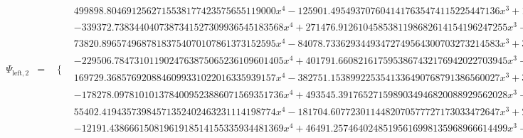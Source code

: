 \documentclass{article}
\begin{document}
\begin{landscape}
\begin{eqnarray*}
\begin{array}{cc}
\end{array}\\
\Psi_{\text{left},2} & = & \begin{array}{cc}
 \{ & 
\begin{array}{cc}
 499898.8046912562715538177423575655119000 x^4-125901.4954937076041417635474115225447136 x^3+10063.51812541990523759074067280460633435 x^2-258.0041589488695995300186908780941589620 x & x\geq 0\land x<\frac{1}{8} \\
 -339372.7383440407387341527309936545183568 x^4+271476.9126104585381198682614154196247255 x^3-79564.22931529188440949102107873763136768 x^2+10078.62875130954778660120003130095756047 x-462.8749842882781474831628981741427228208 & x\geq \frac{1}{8}\land x<\frac{1}{4} \\
 73820.89657496878183754070107861373152595 x^4-84078.73362934493472749564300703273214583 x^3+35604.97321383667501281753900254004432791 x^2-6663.891025729675801403187434644828991624 x+466.1991379955411091305325008009694092379 & x\geq \frac{1}{4}\land x<\frac{3}{8} \\
 -229506.7847310119024763875065236109601405 x^4+401791.6608216175953867432176942022703945 x^3-263037.3081998261763755971914937287747567 x^2+76324.43015099794594543257237031753952351 x-8281.498676654677562417380436273717790529 & x\geq \frac{3}{8}\land x<\frac{1}{2} \\
 169729.3685769208846099331022016335939157 x^4-382751.1538992253541336490768791386560027 x^3+323205.3427727217608361923821132108881951 x^2-121129.1864348841726692230846692387056585 x+17000.23913150896693911705345810932023365 & x\geq \frac{1}{2}\land x<\frac{5}{8} \\
 -178278.0978101013784009523886071569351736 x^4+493545.3917652715989034946820088929562028 x^3-511487.7587585572420278016290558268447302 x^2+235178.2174222086427919344489631059160086 x-40477.75661964319166769769150304287466672 & x\geq \frac{5}{8}\land x<\frac{3}{4} \\
 55402.41943573984571352402463231114198774 x^4-181704.6077230114482070577727173033472647 x^3+223232.1118422871129856317802813026025632 x^2-121753.0871949373134223373450337343730398 x+24873.91200454378648024312545351564725307 & x\geq \frac{3}{4}\land x<\frac{7}{8} \\
 -12191.43866615081961918514155335934481369 x^4+46491.25746402485195616998135968966614499 x^3-66416.66014989020806247197776698942220507 x^2+42125.30257230913873317457766834722522993 x-10008.46122029296300768743970768812435616 & x\geq \frac{7}{8}\land x<1
\end{array}


\end{array}
\end{eqnarray*}
\end{landscape}
\end{document}
